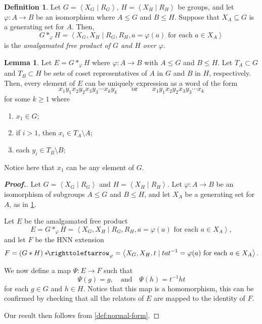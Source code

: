\documentclass[11pt,a4paper,reqno]{amsart}
\theoremstyle{plain}
\theoremstyle{definition}
\newtheorem{lemma}[theorem]{Lemma}
\newtheorem{definition}[theorem]{Definition}
\theoremstyle{definition}
\renewcommand\leq\leqslant
\renewcommand\geq\geqslant
\newenvironment{myproof}{\begin{proof}[\normalfont\bfseries Proof.]}{\end{proof}}
\newcommand\hnn{*\!\!\righttoleftarrow}
\begin{document}
\begin{definition}\label{def:amalgamated}
	Let $G = \left\langle X_G\mid R_G \right\rangle$, $H = \left\langle X_H \mid R_H\right\rangle$ be groups,
	and let $\varphi\colon A\to B$ be an isomorphism where $A\leq G$ and $B\leq H$.
	Suppose that $X_A\subseteq G$ is a generating set for $A$.
	Then,
	\[
		G*_\varphi H
		=
		\left\langle X_G, X_H
		\mid
		R_G, R_H, a = \varphi(a)\text{ for each }a\in X_A
		\right\rangle
	\]
	is the \emph{amalgamated free product of $G$ and $H$ over $\varphi$}.
\end{definition}

\begin{lemma}\label{lem:amalgamated-normal-form}
	Let $E = G *_\varphi H$ where $\varphi\colon A\to B$ with $A\leq G$ and $B \leq H$.
	Let $T_A\subset G$ and $T_B \subset H$ be sets of coset representatives of $A$ in $G$ and $B$ in $H$, respectively.
	Then, every element of $E$ can be uniquely expression as a word of the form
	\[
		x_1 y_1 x_2 y_2 x_3 y_3 \cdots x_k y_k
		\qquad\text{or}\qquad
		x_1 y_1 x_2 y_2 x_3 y_3 \cdots x_k
	\]
	for some $k \geq 1$ where
	\begin{enumerate}
		\item $x_1 \in G$;
		\item if $i > 1$, then $x_i \in T_A\setminus A$;
		\item each $y_i \in T_B\setminus B$;
	\end{enumerate}
	Notice here that $x_1$ can be any element of $G$.
\end{lemma}

\begin{myproof}
	Let $G = \left\langle X_G \mid R_G\right\rangle$ and $H = \left\langle X_H \mid R_H\right\rangle$.
	Let $\varphi\colon A\to B$ be an isomorphism of subgroups $A\leq G$ and $B\leq H$, and let $X_A$ be a generating set for $A$, as in \cref{def:amalgamated}.

	Let $E$ be the amalgamated free product
	\[
		E = G*_\varphi H
		=
		\left\langle X_G, X_H
		\mid
		R_G, R_H, a = \varphi(a)\text{ for each }a\in X_A
		\right\rangle,
	\]
	and let $F$ be the HNN extension
	\[
		F
		=
		(G * H)\hnn_{\varphi}
		=
		\left\langle
		X_G, X_H,t
		\mid
		t a t^{-1} = \varphi(a) \text{ for each }a\in X_A
		\right\rangle.
	\]

	We now define a map $\Psi\colon E\to F$ such that
	\[
		\Psi(g) = g ,\quad
		\text{and}\quad
		\Psi(h) = t^{-1}ht
	\]
	for each $g\in G$ and $h\in H$.
	Notice that this map is a homomorphism, this can be confirmed by checking that all the relators of $E$ are mapped to the identity of $F$.

	Our result then follows from \cref{def:normal-form}.
\end{myproof}
\end{document}
